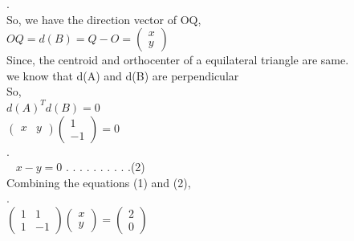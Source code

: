 \documentclass{beamer}
\begin{document}


.\\ So, we have the direction vector of OQ,
\\
\quad  \quad \quad \quad \quad  \quad \quad \quad $ OQ = d(B) = Q - O = 
 \begin{pmatrix}
x \\y 
\end{pmatrix} $\\
Since, the centroid and orthocenter of a equilateral triangle are same.\\ 
 we know that d(A) and d(B) are perpendicular \\
  \quad \quad So, \\
\quad \quad \quad \quad \quad \quad \quad \quad $ d(A)^T d(B) = 0 $ \\
  \quad \quad \quad \quad \quad \quad \quad {} 
    $ \begin{pmatrix}
     x & y 
       \end{pmatrix}
       \begin{pmatrix}
       1 \\ -1
       \end{pmatrix}= 0  $\\ . \\
        \quad \quad
\ \quad \quad   \quad\quad  \quad \quad \quad 
 $ x - y = 0 $ \quad \quad \quad \quad \quad \quad   . . . . . . . . . .(2)\\ 
Combining the equations (1)  and  (2), \\. \\
\quad \quad \quad \quad \quad \quad \quad \quad \quad 
$ \begin{pmatrix}
 1 & 1 \\ 1 & -1 
\end{pmatrix}
\begin{pmatrix}
x \\ y
\end{pmatrix} =
\begin{pmatrix}
2 \\ 0
\end{pmatrix} $

\end{document}
